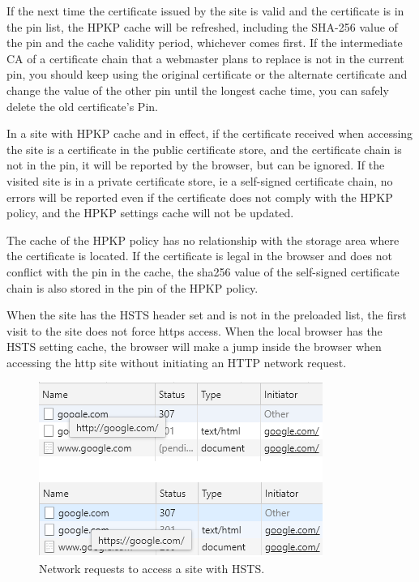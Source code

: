 If the next time the certificate issued by the site is valid and the certificate is in the pin list, the HPKP cache will be refreshed, including the SHA-256 value of the pin and the cache validity period, whichever comes first. If the intermediate CA of a certificate chain that a webmaster plans to replace is not in the current pin, you should keep using the original certificate or the alternate certificate and change the value of the other pin until the longest cache time, you can safely delete the old certificate's Pin.

In a site with HPKP cache and in effect, if the certificate received when accessing the site is a certificate in the public certificate store, and the certificate chain is not in the pin, it will be reported by the browser, but can be ignored. If the visited site is in a private certificate store, ie a self-signed certificate chain, no errors will be reported even if the certificate does not comply with the HPKP policy, and the HPKP settings cache will not be updated.

The cache of the HPKP policy has no relationship with the storage area where the certificate is located. If the certificate is legal in the browser and does not conflict with the pin in the cache, the sha256 value of the self-signed certificate chain is also stored in the pin of the HPKP policy.

When the site has the HSTS header set and is not in the preloaded list, the first visit to the site does not force https access. When the local browser has the HSTS setting cache, the browser will make a jump inside the browser when accessing the http site without initiating an HTTP network request.

\begin{figure}[htbp]
\centerline{\includegraphics{Figure/fig5.png}}
\caption{Network requests to access a site with HSTS.}
\label{fig}
\end{figure}


